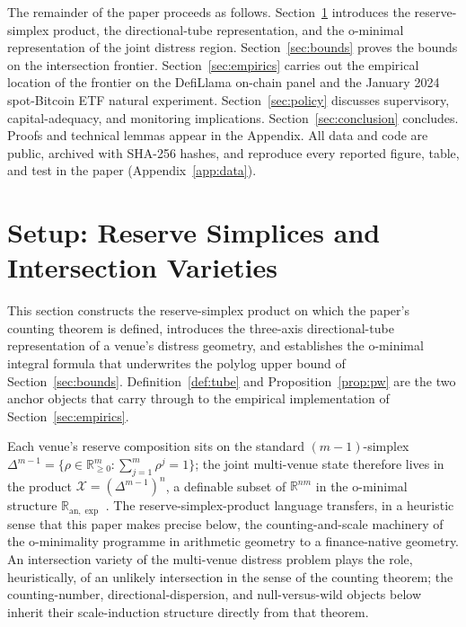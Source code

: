 \documentclass[12pt]{article}
\theoremstyle{sampledef}
\theoremstyle{sampleplain}
\theoremstyle{sampleremark}
\newcommand{\R}{\mathbb{R}}
\newcommand{\1}{\mathbf{1}}
\begin{document}
The remainder of the paper proceeds as follows. Section~\ref{sec:setup}
introduces the reserve-simplex product, the directional-tube
representation, and the o-minimal representation of the joint
distress region. Section~\ref{sec:bounds} proves the bounds on the
intersection frontier. Section~\ref{sec:empirics} carries out the
empirical location of the frontier on the DefiLlama on-chain panel
and the January 2024 spot-Bitcoin ETF natural experiment.
Section~\ref{sec:policy} discusses supervisory, capital-adequacy,
and monitoring implications. Section~\ref{sec:conclusion} concludes.
Proofs and technical lemmas appear in the Appendix. All data and code
are public, archived with SHA-256 hashes, and reproduce every reported
figure, table, and test in the paper (Appendix~\ref{app:data}).

\section{Setup: Reserve Simplices and Intersection Varieties}
\label{sec:setup}

This section constructs the reserve-simplex product on which the
paper's counting theorem is defined, introduces the three-axis
directional-tube representation of a venue's distress geometry, and
establishes the o-minimal integral formula that underwrites the
polylog upper bound of Section~\ref{sec:bounds}.
Definition~\ref{def:tube} and Proposition~\ref{prop:pw} are the two
anchor objects that carry through to the empirical implementation
of Section~\ref{sec:empirics}.

Each venue's reserve composition sits on the standard
$(m-1)$-simplex
$\Delta^{m-1} = \{\rho \in \R^m_{\ge 0} : \sum_{j=1}^{m}\rho^j = 1\}$;
the joint multi-venue state therefore lives in the product
$\mathcal{X} = (\Delta^{m-1})^n$, a definable subset of $\R^{nm}$
in the o-minimal structure $\R_{\mathrm{an},\exp}$
\citep{vandenDries1998Tame}. The
reserve-simplex-product language transfers, in a heuristic sense
that this paper makes precise below, the counting-and-scale
machinery of the o-minimality programme in arithmetic geometry
\citep{PilaWilkie2006, Pila2011ManinMumford,
BakkerKlinglerTsimerman2020} to a finance-native geometry. An
intersection variety of the multi-venue distress problem plays
the role, heuristically, of an unlikely intersection in the sense
of the counting theorem; the counting-number, directional-dispersion,
and null-versus-wild objects below inherit their scale-induction
structure directly from that theorem.
\end{document}
